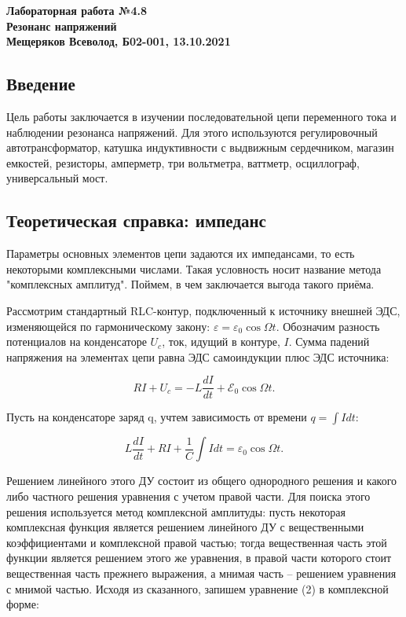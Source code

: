 \documentclass[a4paper, fontsize = 14pt]{article}
\begin{document}
\begin{center} \textbf{
Лабораторная работа №4.8 \\ Резонанс напряжений \\ 
Мещеряков Всеволод, Б02-001, 13.10.2021}
\end{center} 

\subsection*{Введение}

Цель работы заключается в изучении последовательной цепи переменного тока и наблюдении резонанса напряжений. Для этого используются регулировочный автотрансформатор, катушка индуктивности с выдвижным сердечником, магазин емкостей, резисторы, амперметр, три вольтметра, ваттметр, осциллограф, универсальный мост.

\subsection*{Теоретическая справка: импеданс}

Параметры основных элементов цепи задаются их импедансами, то есть некоторыми комплексными числами. Такая условность носит название метода "комплексных амплитуд". Поймем, в чем заключается выгода такого приёма.

Рассмотрим стандартный RLC-контур, подключенный к источнику внешней ЭДС, изменяющейся по гармоническому закону: $\varepsilon = \varepsilon_0 \cos{\Omega t}$. Обозначим разность потенциалов на конденсаторе $U_c$, ток, идущий в контуре, $I$. Сумма падений напряжения на элементах цепи равна ЭДС самоиндукции плюс ЭДС источника:

\begin{equation}
	RI + U_c = -L \frac{dI}{dt} + \mathcal{E}_0 \cos{\Omega t}.
\end{equation}

Пусть на конденсаторе заряд q, учтем зависимость от времени $q = \int I dt$:

\begin{equation}
	L \frac{dI}{dt} + RI + \frac{1}{C} \int I dt = \varepsilon_0 \cos{\Omega t}.
\end{equation}

Решением линейного этого ДУ состоит из общего однородного решения и какого либо частного решения уравнения с учетом правой части. Для поиска этого решения используется метод комплексной амплитуды: пусть некоторая комплексная функция является решением линейного ДУ с вещественными коэффициентами и комплексной правой частью; тогда вещественная часть этой функции является решением этого же уравнения, в правой части которого стоит вещественная часть прежнего выражения, а мнимая часть -- решением уравнения с мнимой частью. Исходя из сказанного, запишем уравнение (2) в комплексной форме:
\end{document}
